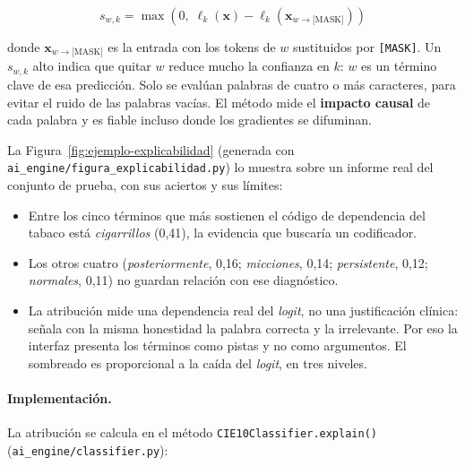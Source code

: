 \begin{equation}
 s_{w,k} = \max\!\left(0,\; \ell_k(\mathbf{x}) - \ell_k(\mathbf{x}_{w \to \text{[MASK]}})\right)
\end{equation}

donde $\mathbf{x}_{w \to \text{[MASK]}}$ es la entrada con los tokens de $w$ sustituidos por \texttt{[MASK]}. Un $s_{w,k}$ alto indica que quitar $w$ reduce mucho la confianza en $k$: $w$ es un término clave de esa predicción. Solo se evalúan palabras de cuatro o más caracteres, para evitar el ruido de las palabras vacías. El método mide el \textbf{impacto causal} de cada palabra y es fiable incluso donde los gradientes se difuminan.

La Figura~\ref{fig:ejemplo-explicabilidad} (generada con \texttt{ai\_engine/figura\_explicabilidad.py}) lo muestra sobre un informe real del conjunto de prueba, con sus aciertos y sus límites:

\begin{itemize}
 \item Entre los cinco términos que más sostienen el código de dependencia del tabaco está \emph{cigarrillos} (0,41), la evidencia que buscaría un codificador.
 \item Los otros cuatro (\emph{posteriormente}, 0,16; \emph{micciones}, 0,14; \emph{persistente}, 0,12; \emph{normales}, 0,11) no guardan relación con ese diagnóstico.
 \item La atribución mide una dependencia real del \emph{logit}, no una justificación clínica: señala con la misma honestidad la palabra correcta y la irrelevante. Por eso la interfaz presenta los términos como pistas y no como argumentos. El sombreado es proporcional a la caída del \emph{logit}, en tres niveles.
\end{itemize}




\paragraph{Implementación.}
La atribución se calcula en el método \texttt{CIE10Classifier.explain()} (\texttt{ai\_engine/classifier.py}):

